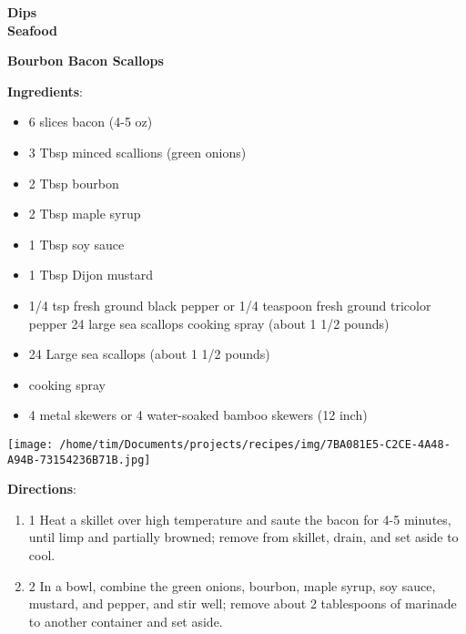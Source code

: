 \documentclass[11pt, twoside, openany]{book}
\begin{document}
{\newpage \LARGE \textbf{Dips}} \label{dips}\\

{\newpage \LARGE \textbf{Seafood}} \label{seafood}\\
\noindent\begin{minipage}[t]{\linewidth}%
{\Large\textbf{Bourbon Bacon Scallops}} \label{bourbon-bacon-scallops}\hfill\textit{}\\
\noindent\begin{minipage}[t]{0.78\linewidth}%
\textbf{Ingredients}:\vspace{-3mm}
\begin{multicols}{2}
\begin{itemize}\setlength\itemsep{-1mm}
\item 6 slices bacon (4-5 oz)
\item 3 Tbsp minced scallions (green onions)
\item 2 Tbsp bourbon
\item 2 Tbsp maple syrup
\item 1 Tbsp soy sauce
\item 1 Tbsp Dijon mustard
\item 1/4 tsp fresh ground black pepper or 1/4 teaspoon fresh ground tricolor pepper 24 large sea scallops cooking spray (about 1 1/2 pounds)
\item 24 Large sea scallops (about 1 1/2 pounds)
\item cooking spray
\item 4 metal skewers or 4 water-soaked bamboo skewers (12 inch)
\end{itemize}
\end{multicols}
\end{minipage}
\noindent\begin{minipage}[t]{0.18\linewidth}
\centering \strut\vspace*{-\baselineskip}\newline
\texttt{[image: /home/tim/Documents/projects/recipes/img/7BA081E5-C2CE-4A48-A94B-73154236B71B.jpg]}\\
\end{minipage}\vspace{3mm}
\textbf{Directions}:
\vspace{-3mm}\begin{enumerate}\setlength\itemsep{-1mm}
\item 1 Heat a skillet over high temperature and saute the bacon for 4-5 minutes, until limp and partially browned; remove from skillet, drain, and set aside to cool. 
\item 2 In a bowl, combine the green onions, bourbon, maple syrup, soy sauce, mustard, and pepper, and stir well; remove about 2 tablespoons of marinade to another container and set aside. 

\end{enumerate}
\end{minipage}
\end{document}
